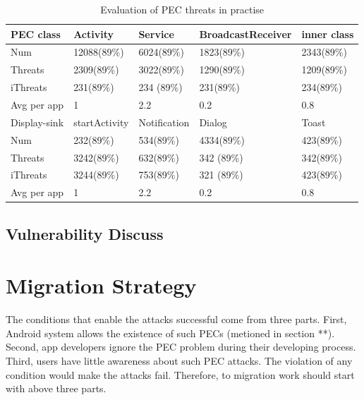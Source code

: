 \documentclass{sig-alternate-05-2015}
\begin{document}
\begin{table}[htbp]
\centering
 \caption{\label{tab:test} Evaluation of PEC threats in practise}
 \begin{tabularx}{\linewidth}{XXXXX}

  \toprule
  PEC class  & Activity & Service & BroadcastReceiver & inner class \\
  \midrule
 Num & 12088(89\%) & 6024(89\%) & 1823(89\%) & 2343(89\%) \\
 Threats  & 2309(89\%) & 3022(89\%) & 1290(89\%) & 1209(89\%)\\ 
 iThreats  & 231(89\%) & 234 (89\%)& 231(89\%) & 234(89\%)\\
 Avg per app & 1 & 2.2 & 0.2 & 0.8\\
 \bottomrule
 
 \toprule
 Display-sink & startActivity & Notification & Dialog & Toast \\ 
 \midrule   
 Num & 232(89\%) & 534(89\%) & 4334(89\%) & 423(89\%)\\
 Threats & 3242(89\%) & 632(89\%) & 342 (89\%)& 342(89\%)\\
 iThreats & 3244(89\%) & 753(89\%) & 321 (89\%)& 423(89\%)\\
 Avg per app & 1 & 2.2 & 0.2 & 0.8\\
     
  \bottomrule
 \end{tabularx}
\end{table}


\subsection{Vulnerability Discuss}

\section{Migration Strategy}
The conditions that enable the attacks successful come from three parts. First, Android system allows the existence of such PECs (metioned in section **). Second, app developers ignore the PEC problem during their developing process. Third, users have little awareness about such PEC attacks. The violation of any condition would make the attacks fail. Therefore, to migration work should start with above three parts.
 
\end{document}
